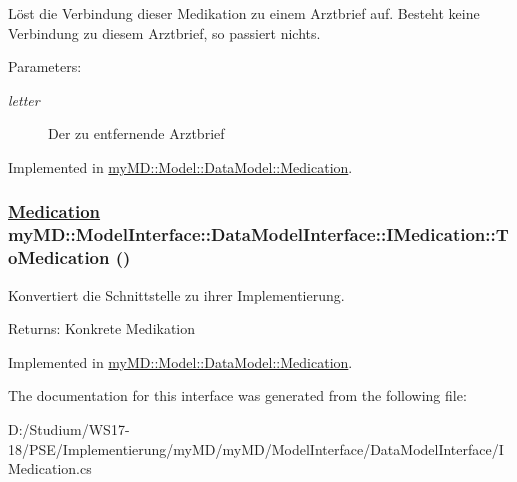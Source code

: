 L\"{o}st die Verbindung dieser Medikation zu einem Arztbrief auf. Besteht keine Verbindung zu diesem Arztbrief, so passiert nichts. 

\begin{Desc}
\item[Parameters:]
\begin{description}
\item[{\em letter}]Der zu entfernende Arztbrief\end{description}
\end{Desc}


Implemented in \hyperlink{classmy_m_d_1_1_model_1_1_data_model_1_1_medication_d1ca6f76b75fe87eac94cbac8bc61322}{my\-MD::Model::Data\-Model::Medication}.\hypertarget{interfacemy_m_d_1_1_model_interface_1_1_data_model_interface_1_1_i_medication_be8159bf4c393a1da18275bd4dfa8e4a}{
\subsubsection[ToMedication]{\setlength{\rightskip}{0pt plus 5cm}\hyperlink{classmy_m_d_1_1_model_1_1_data_model_1_1_medication}{Medication} my\-MD::Model\-Interface::Data\-Model\-Interface::IMedication::To\-Medication ()}}
\label{d2/dce/interfacemy_m_d_1_1_model_interface_1_1_data_model_interface_1_1_i_medication_be8159bf4c393a1da18275bd4dfa8e4a}


Konvertiert die Schnittstelle zu ihrer Implementierung. 

\begin{Desc}
\item[Returns:]Konkrete Medikation\end{Desc}


Implemented in \hyperlink{classmy_m_d_1_1_model_1_1_data_model_1_1_medication_be8159bf4c393a1da18275bd4dfa8e4a}{my\-MD::Model::Data\-Model::Medication}.

The documentation for this interface was generated from the following file:\begin{CompactItemize}
\item 
D:/Studium/WS17-18/PSE/Implementierung/my\-MD/my\-MD/Model\-Interface/Data\-Model\-Interface/IMedication.cs\end{CompactItemize}
